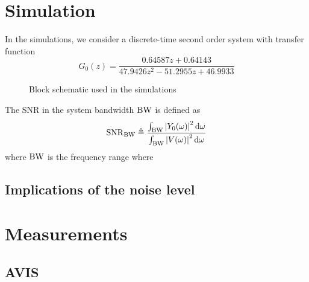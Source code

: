 \section{Simulation}
\label{sec:simulations}

In the simulations, we consider a discrete-time second order system with transfer function
\begin{equation}
G_0(z) = \frac{0.64587 z + 0.64143}
                             {47.9426 z^2 - 51.2955 z + 46.9933}
\end{equation}


\begin{figure}
 \centering
  
  \caption{Block schematic used in the simulations}
\end{figure}


The \gls{SNR} in the system bandwidth $\mathrm{BW}$ is defined as
\begin{equation}
  \mathrm{SNR}_{\mathrm{BW}} \triangleq
  \frac{\int_{\mathrm{BW}} \left| Y_0(\omega) \right|^2 \mathrm{d}{\omega}}
            {\int_{\mathrm{BW}} \left| V(\omega) \right|^2 \mathrm{d}{\omega}}
\end{equation}
where $\mathrm{BW}$ is the frequency range where



  \subsection{Implications of the noise level}


  \section{Measurements}
  \label{sec:measurements}
   \subsection{AVIS}

